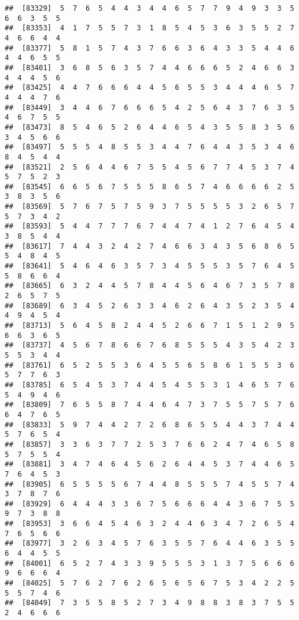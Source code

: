 \documentclass[
]{book}
\begin{document}
\begin{verbatim}
##  [83329]  5  7  6  5  4  4  3  4  4  6  5  7  7  9  4  9  3  3  5  6  6  3  5  5
##  [83353]  4  1  7  5  5  7  3  1  8  5  4  5  3  6  3  5  5  2  7  4  6  6  4  4
##  [83377]  5  8  1  5  7  4  3  7  6  6  3  6  4  3  3  5  4  4  6  4  4  6  5  5
##  [83401]  3  6  8  5  6  3  5  7  4  4  6  6  6  5  2  4  6  6  3  4  4  4  5  6
##  [83425]  4  4  7  6  6  6  4  4  5  6  5  5  3  4  4  4  6  5  7  4  4  4  7  6
##  [83449]  3  4  4  6  7  6  6  6  5  4  2  5  6  4  3  7  6  3  5  4  6  7  5  5
##  [83473]  8  5  4  6  5  2  6  4  4  6  5  4  3  5  5  8  3  5  6  3  4  5  6  6
##  [83497]  5  5  5  4  8  5  5  3  4  4  7  6  4  4  3  5  3  4  6  8  4  5  4  4
##  [83521]  2  5  6  4  4  6  7  5  5  4  5  6  7  7  4  5  3  7  4  5  7  5  2  3
##  [83545]  6  6  5  6  7  5  5  5  8  6  5  7  4  6  6  6  6  2  5  3  8  3  5  6
##  [83569]  5  7  6  7  5  7  5  9  3  7  5  5  5  5  3  2  6  5  7  5  7  3  4  2
##  [83593]  5  4  4  7  7  7  6  7  4  4  7  4  1  2  7  6  4  5  4  3  8  5  4  4
##  [83617]  7  4  4  3  2  4  2  7  4  6  6  3  4  3  5  6  8  6  5  5  4  8  4  5
##  [83641]  5  4  6  4  6  3  5  7  3  4  5  5  5  3  5  7  6  4  5  5  8  6  6  4
##  [83665]  6  3  2  4  4  5  7  8  4  4  5  6  4  6  7  3  5  7  8  2  6  5  7  5
##  [83689]  6  3  4  5  2  6  3  3  4  6  2  6  4  3  5  2  3  5  4  4  9  4  5  4
##  [83713]  5  6  4  5  8  2  4  4  5  2  6  6  7  1  5  1  2  9  5  6  6  3  6  5
##  [83737]  4  5  6  7  8  6  6  7  6  8  5  5  5  4  3  5  4  2  3  5  5  3  4  4
##  [83761]  6  5  2  5  5  3  6  4  5  5  6  5  8  6  1  5  5  3  6  5  7  7  6  3
##  [83785]  6  5  4  5  3  7  4  4  5  4  5  5  3  1  4  6  5  7  6  5  4  9  4  6
##  [83809]  7  6  5  5  8  7  4  4  6  4  7  3  7  5  5  7  5  7  6  6  4  7  6  5
##  [83833]  5  9  7  4  4  2  7  2  6  8  6  5  5  4  4  3  7  4  4  5  7  6  5  4
##  [83857]  3  3  6  3  7  7  2  5  3  7  6  6  2  4  7  4  6  5  8  5  7  5  5  4
##  [83881]  3  4  7  4  6  4  5  6  2  6  4  4  5  3  7  4  4  6  5  7  6  4  5  3
##  [83905]  6  5  5  5  5  6  7  4  4  8  5  5  5  7  4  5  5  7  4  3  7  8  7  6
##  [83929]  6  4  4  4  3  3  6  7  5  6  6  6  4  4  3  6  7  5  5  9  7  3  8  8
##  [83953]  3  6  6  4  5  4  6  3  2  4  4  6  3  4  7  2  6  5  4  7  6  5  6  6
##  [83977]  3  2  6  3  4  5  7  6  3  5  5  7  6  4  4  6  3  5  5  6  4  4  5  5
##  [84001]  6  5  2  7  4  3  3  9  5  5  5  3  1  3  7  5  6  6  6  9  6  6  6  4
##  [84025]  5  7  6  2  7  6  2  6  5  6  5  6  7  5  3  4  2  2  5  5  5  7  4  6
##  [84049]  7  3  5  5  8  5  2  7  3  4  9  8  8  3  8  3  7  5  5  2  4  6  6  6

\end{verbatim}
\end{document}
